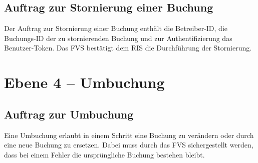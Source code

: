 \subsection{Auftrag zur Stornierung einer Buchung}
Der Auftrag zur Stornierung einer Buchung enthält die Betreiber-ID, die Buchungs-ID der zu stornierenden Buchung und zur Authentifizierung das Benutzer-Token. Das FVS bestätigt dem RIS die Durchführung der Stornierung.

\section{Ebene 4 -- Umbuchung}

\subsection{Auftrag zur Umbuchung}
Eine Umbuchung erlaubt in einem Schritt eine Buchung zu verändern oder durch eine neue Buchung zu ersetzen. Dabei muss durch das FVS sichergestellt werden, dass bei einem Fehler die ursprüngliche Buchung bestehen bleibt.
